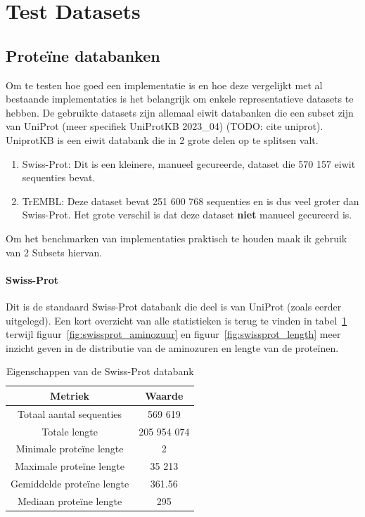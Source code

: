 \documentclass[11pt,dutch,faculty=we,layout=titlefont,underline=false,titleUppercase=true,titleUnderline=true]{ugent2016-report}
\begin{document}
    \section{Test Datasets}\label{sec:datasets}

    \subsection{Proteïne databanken}\label{subsec:proteine-databanken}
    Om te testen hoe goed een implementatie is en hoe deze vergelijkt met al bestaande implementaties is het belangrijk om enkele representatieve datasets te hebben.
    De gebruikte datasets zijn allemaal eiwit databanken die een subset zijn van UniProt (meer specifiek UniProtKB 2023\_04) (TODO: cite uniprot).
    UniprotKB is een eiwit databank die in 2 grote delen op te splitsen valt.
    \begin{enumerate}
        \item Swiss-Prot: Dit is een kleinere, manueel gecureerde, dataset die 570 157 eiwit sequenties bevat.
        \item TrEMBL: Deze dataset bevat 251 600 768 sequenties en is dus veel groter dan Swiss-Prot.
        Het grote verschil is dat deze dataset \textbf{niet} manueel gecureerd is.
    \end{enumerate}

    Om het benchmarken van implementaties praktisch te houden maak ik gebruik van 2 Subsets hiervan.

    \paragraph{Swiss-Prot} Dit is de standaard Swiss-Prot databank die deel is van UniProt (zoals eerder uitgelegd).
    Een kort overzicht van alle statistieken is terug te vinden in tabel~\ref{tab:swissprot_eigenschappen} terwijl figuur~\ref{fig:swissprot_aminozuur} en figuur~\ref{fig:swissprot_length} meer inzicht geven in de distributie van de aminozuren en lengte van de proteïnen.

    \begin{table}[h!]
        \centering
        \begin{tabular}{c c}
            Metriek                    & Waarde      \\
            \hline\hline
            Totaal aantal sequenties   & 569 619     \\
            Totale lengte              & 205 954 074 \\
            Minimale proteïne lengte   & 2           \\
            Maximale proteïne lengte   & 35 213      \\
            Gemiddelde proteïne lengte & 361.56      \\
            Mediaan proteïne lengte    & 295         \\
            \hline
        \end{tabular}
        \caption{Eigenschappen van de Swiss-Prot databank}
        \label{tab:swissprot_eigenschappen}
    \end{table}
\end{document}
